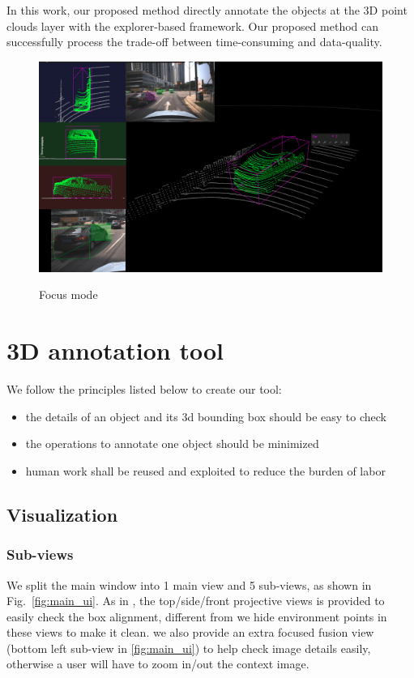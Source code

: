 \documentclass[letterpaper, 10 pt, conference]{ieeeconf}  %
\begin{document}
In this work, our proposed method directly annotate the objects at the 3D point clouds layer with the explorer-based framework. Our proposed method can successfully process the trade-off between time-consuming and data-quality.
\begin{figure}[!th]
	\centering	
	\includegraphics[width=0.9\linewidth]{./figures/focus-mode}\\
	\caption{Focus mode}
	\label{fig:focus-mode}
\end{figure}
\section{3D annotation tool}
\label{3D annotation tool}

We follow the principles listed below to create our tool:

\begin{itemize}
	\item the details of an object and its 3d bounding box should be easy to check
	\item the operations to annotate one object should be minimized
	\item human work shall be reused and exploited to reduce the burden of labor
\end{itemize}

\subsection{Visualization}

\subsubsection{Sub-views}
We split the main window into 1 main view and 5 sub-views, as shown in Fig.~\ref{fig:main_ui}. As in \cite{Zimmer20193DBA, more..}, the top/side/front projective views is provided to easily check the box alignment, different from \cite{Zimmer20193DBA} we hide environment points in these views to make it clean. we also provide an extra focused fusion view (bottom left sub-view in \ref{fig:main_ui}) to help check image details easily, otherwise a user will have to zoom in/out the context image.
\end{document}
